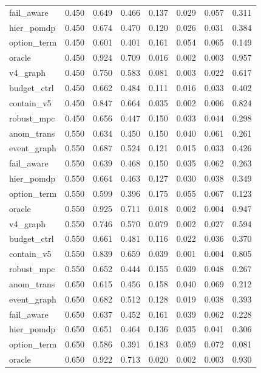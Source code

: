 \documentclass{article}
\begin{document}
\begin{longtable}{@{}lrrrrrrr@{}}
fail\_aware & 0.450 & 0.649 & 0.466 & 0.137 & 0.029 & 0.057 & 0.311 \\
hier\_pomdp & 0.450 & 0.674 & 0.470 & 0.120 & 0.026 & 0.031 & 0.384 \\
option\_term & 0.450 & 0.601 & 0.401 & 0.161 & 0.054 & 0.065 & 0.149 \\
oracle & 0.450 & 0.924 & 0.709 & 0.016 & 0.002 & 0.003 & 0.957 \\
v4\_graph & 0.450 & 0.750 & 0.583 & 0.081 & 0.003 & 0.022 & 0.617 \\
budget\_ctrl & 0.450 & 0.662 & 0.484 & 0.111 & 0.016 & 0.033 & 0.402 \\
contain\_v5 & 0.450 & 0.847 & 0.664 & 0.035 & 0.002 & 0.006 & 0.824 \\
robust\_mpc & 0.450 & 0.656 & 0.447 & 0.150 & 0.033 & 0.044 & 0.298 \\
anom\_trans & 0.550 & 0.634 & 0.450 & 0.150 & 0.040 & 0.061 & 0.261 \\
event\_graph & 0.550 & 0.687 & 0.524 & 0.121 & 0.015 & 0.033 & 0.426 \\
fail\_aware & 0.550 & 0.639 & 0.468 & 0.150 & 0.035 & 0.062 & 0.263 \\
hier\_pomdp & 0.550 & 0.664 & 0.463 & 0.127 & 0.030 & 0.038 & 0.349 \\
option\_term & 0.550 & 0.599 & 0.396 & 0.175 & 0.055 & 0.067 & 0.123 \\
oracle & 0.550 & 0.925 & 0.711 & 0.018 & 0.002 & 0.004 & 0.947 \\
v4\_graph & 0.550 & 0.746 & 0.570 & 0.079 & 0.002 & 0.027 & 0.594 \\
budget\_ctrl & 0.550 & 0.661 & 0.481 & 0.116 & 0.022 & 0.036 & 0.370 \\
contain\_v5 & 0.550 & 0.839 & 0.659 & 0.039 & 0.001 & 0.004 & 0.805 \\
robust\_mpc & 0.550 & 0.652 & 0.444 & 0.155 & 0.039 & 0.048 & 0.267 \\
anom\_trans & 0.650 & 0.615 & 0.456 & 0.158 & 0.040 & 0.069 & 0.212 \\
event\_graph & 0.650 & 0.682 & 0.512 & 0.128 & 0.019 & 0.038 & 0.393 \\
fail\_aware & 0.650 & 0.637 & 0.452 & 0.161 & 0.039 & 0.062 & 0.228 \\
hier\_pomdp & 0.650 & 0.651 & 0.464 & 0.136 & 0.035 & 0.041 & 0.306 \\
option\_term & 0.650 & 0.586 & 0.391 & 0.183 & 0.059 & 0.072 & 0.081 \\
oracle & 0.650 & 0.922 & 0.713 & 0.020 & 0.002 & 0.003 & 0.930 \\

\end{longtable}
\end{document}
